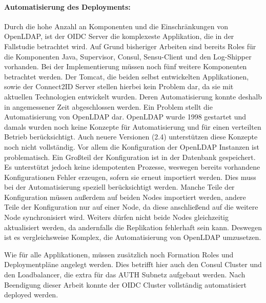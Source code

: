 \paragraph{Automatisierung des Deployments:}
Durch die hohe Anzahl an Komponenten und die Einschränkungen von OpenLDAP, ist der OIDC Server die komplexeste Applikation, die in der Fallstudie betrachtet wird. Auf Grund bisheriger Arbeiten sind bereits Roles für die Komponenten Java, Supervisor, Consul, Sensu-Client und den Log-Shipper vorhanden. Bei der Implementierung müssen noch fünf weitere Komponenten betrachtet werden. Der Tomcat, die beiden selbst entwickelten Applikationen, sowie der Connect2ID Server stellen hierbei kein Problem dar, da sie mit aktuellen Technologien entwickelt wurden. Deren Automatisierung konnte deshalb in angemessener Zeit abgeschlossen werden. Ein Problem stellt die Automatisierung von OpenLDAP dar. OpenLDAP wurde 1998 gestartet und damals wurden noch keine Konzepte für Automatisierung und für einen verteilten Betrieb berücksichtigt. Auch neuere Versionen (2.4) unterstützen diese Konzepte noch nicht vollständig. Vor allem die Konfiguration der OpenLDAP Instanzen ist problematisch. Ein Großteil der Konfiguration ist in der Datenbank gespeichert. Es unterstützt jedoch keine idempotenten Prozesse, weswegen bereits vorhandene Konfigurationen Fehler erzeugen, sofern sie erneut importiert werden. Dies muss bei der Automatisierung speziell berücksichtigt werden. Manche Teile der Konfiguration müssen außerdem auf beiden Nodes importiert werden, andere Teile der Konfiguration nur auf einer Node, da diese anschließend auf die weitere Node synchronisiert wird. Weiters dürfen nicht beide Nodes gleichzeitig aktualisiert werden, da andernfalls die Replikation fehlerhaft sein kann. Deswegen ist es vergleichsweise Komplex, die Automatisierung von OpenLDAP umzusetzen.

Wie für alle Applikationen, müssen zusätzlich noch Formation Roles und Deploymentpläne angelegt werden. Dies betrifft hier auch den Consul Cluster und den Loadbalancer, die extra für das AUTH Subnetz aufgebaut werden. Nach Beendigung dieser Arbeit konnte der OIDC Cluster vollständig automatisiert deployed werden.

